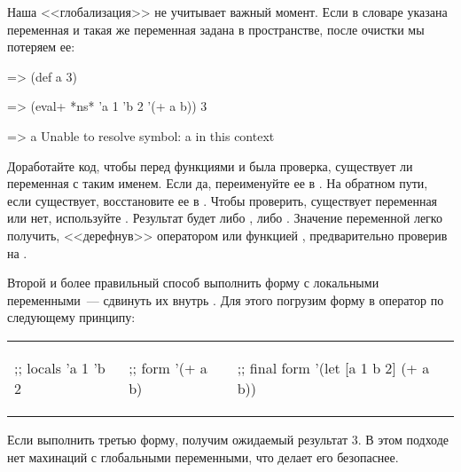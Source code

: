 Наша <<глобализация>> не учитывает важный момент. Если в словаре указана переменная  и такая же переменная задана в пространстве, после очистки мы потеряем ее:

\begin{english}
  \begin{clojure}
=> (def a 3)

=> (eval+ *ns* {'a 1 'b 2} '(+ a b))
3

=> a
Unable to resolve symbol: a in this context
  \end{clojure}
\end{english}

Доработайте код, чтобы перед функциями  и  была проверка, существует ли переменная с таким именем. Если да, переименуйте ее в . На обратном пути, если  существует, восстановите ее в . Чтобы проверить, существует переменная или нет, используйте . Результат будет либо , либо . Значение переменной легко получить, <<дерефнув>>  оператором  или функцией , предварительно проверив на .

Второй и более правильный способ выполнить форму с локальными переменными~--- сдвинуть их внутрь . Для этого погрузим форму в оператор  по следующему принципу:

\begin{english}
\noindent
\begin{tabular}{ @{}p{3.5cm} @{}p{3cm} @{}p{3cm} }

  \begin{clojure}
;; locals
{'a 1 'b 2}
  \end{clojure}

&

  \begin{clojure}
;; form
'(+ a b)
  \end{clojure}

&

  \begin{clojure}
;; final form
'(let [a 1 b 2]
   (+ a b))
  \end{clojure}

\end{tabular}
\end{english}

Если выполнить третью форму, получим ожидаемый результат 3. В этом подходе нет махинаций с глобальными переменными, что делает его безопаснее.

